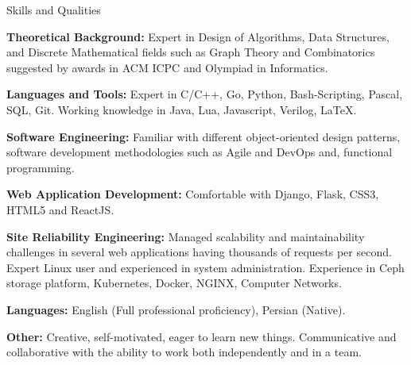 \documentclass{resume} %
\begin{document}
\begin{rSection}{Skills and Qualities}

	{\bf Theoretical Background:}
	Expert in Design of Algorithms, Data Structures, and Discrete Mathematical fields such as Graph Theory and Combinatorics suggested by awards in ACM ICPC and Olympiad in Informatics.

	{\bf Languages and Tools:}
	Expert in C/C++, Go, Python, Bash-Scripting, Pascal, SQL, Git. Working knowledge in Java, Lua, Javascript, Verilog, \LaTeX.

	{\bf Software Engineering:}
	Familiar with different object-oriented design patterns, software development methodologies such as Agile and DevOps and, functional programming.

	{\bf Web Application Development:}
	Comfortable with Django, Flask, CSS3, HTML5 and ReactJS.

	{\bf Site Reliability Engineering:}
	Managed scalability and maintainability challenges in several web applications having thousands of requests per second.
	Expert Linux user and experienced in system administration.
	Experience in Ceph storage platform, Kubernetes, Docker, NGINX, Computer Networks.

	{\bf Languages:}
	English (Full professional proficiency), Persian (Native).

	{\bf Other:}
	Creative, self-motivated, eager to learn new things. Communicative and collaborative with the ability to work both independently and in a team.

\end{rSection}
	
\end{document}
